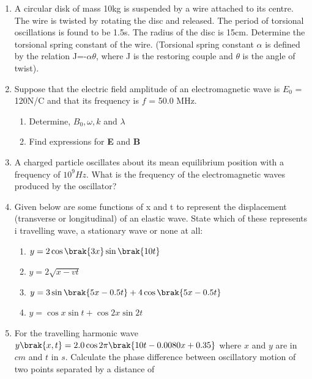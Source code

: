 \begin{enumerate}[label=\thesection.\arabic*,ref=\thesection.\theenumi]
\item A circular disk of mass 10kg is suspended by a wire attached to its centre. The wire is twisted by rotating the disc and released. The period of torsional oscillations is found to be 1.5s. The radius of the disc is 15cm. Determine the torsional spring constant of the wire. (Torsional spring constant $\alpha$ is defined by the relation J=-$\alpha$$\theta$, where J is the restoring couple and $\theta$ is the angle of twist).\\
\solution

\pagebreak
\item Suppose that the electric field amplitude of an electromagnetic wave is $E_0$ = 120N/C and that its frequency is $f$ = 50.0 MHz.
\begin{enumerate} [label=(\alph*)]
    \item Determine, $B_0, \omega, k$ and $\lambda$
    \item Find expressions for \textbf{E} and \textbf{B}
\end{enumerate}
\solution


\pagebreak
\item A charged particle oscillates about its mean equilibrium position with a frequency of $10^9Hz$. What is the frequency of the electromagnetic waves produced by the oscillator? \\
\solution

\pagebreak
\item Given below are some functions of x and t to 
represent the displacement (transverse
or longitudinal) of an elastic wave. State which of these represents \brak i travelling
wave,  a stationary wave or  none at all: \\
\begin{enumerate}
\item $y = 2\cos \brak{3x} \sin \brak{10t}$
\item $y=2\sqrt{x-vt}$
\item $y = 3\sin \brak{5x - 0.5t} + 4\cos \brak{5x - 0.5t}$
\item $y = \cos x \sin t + \cos 2x \sin 2t$
\end{enumerate}
\solution


\pagebreak
\item For the travelling harmonic wave
$y\brak {x, t} = 2.0 \cos 2\pi \brak{10t - 0.0080 x + 0.35}$ where $x$ and $y$ are in $cm$ and $t$ in $s$. Calculate the phase difference between oscillatory
motion of two points separated by a distance of 


\end{enumerate}
